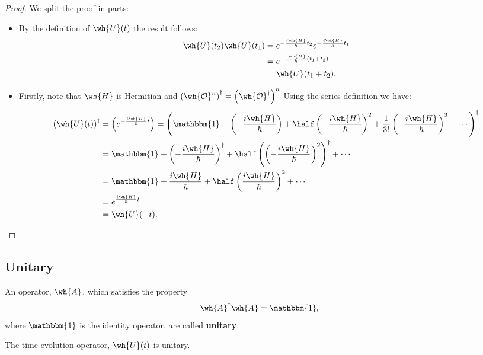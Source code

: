 \documentclass[12pt, a4paper]{article}
\begin{document}
\begin{proof}
    We split the proof in parts:
    \begin{itemize}
        \item By the definition of \(\wh{U}(t)\) the result follows:
        \[\begin{aligned}
            \wh{U}(t_2)\wh{U}(t_1) &= e^{-\frac{i\wh{H}}{\hbar}t_2} e^{-\frac{i\wh{H}}{\hbar}t_1} \\
            &= e^{-\frac{i\wh{H}}{\hbar}(t_1+t_2)} \\
            &= \wh{U}(t_1+t_2).
        \end{aligned}\]
        \item Firstly, note that \(\wh{H}\) is Hermitian and \(\left( \wh{\mathcal{O}}^n \right)^{\dagger} = \left( \wh{\mathcal{O}}^{\dagger} \right)^n\) Using the series definition we have:
        \[\begin{aligned}
            \left( \wh{U}(t) \right)^{\dagger} &= \left( e^{-\frac{i\wh{H}}{\hbar}t} \right) = \left( \mathbbm{1} + \left( -\frac{i\wh{H}}{\hbar} \right) + \half \left(  -\frac{i\wh{H}}{\hbar} \right)^2 + \frac{1}{3!} \left( -\frac{i\wh{H}}{\hbar} \right)^3+\cdots \right)^{\dagger} \\
            &= \mathbbm{1} + \left( -\frac{i\wh{H}}{\hbar} \right)^{\dagger} + \half \left( \left( -\frac{i\wh{H}}{\hbar} \right)^2 \right)^{\dagger} + \cdots \\
            &= \mathbbm{1} + \frac{i\wh{H}}{\hbar} + \half \left( \frac{i\wh{H}}{\hbar} \right)^2 +\cdots \\
            &= e^{\frac{i\wh{H}}{\hbar}t} \\
            &= \wh{U}(-t).
        \end{aligned}\]
    \end{itemize}
\end{proof}

\subsection{Unitary}

\begin{definition}
    An operator, \(\wh{A}\), which satisfies the property
    \[\wh{A}^{\dagger}\wh{A} = \mathbbm{1},\]
    where \(\mathbbm{1}\) is the identity operator, are called \textbf{unitary}.
\end{definition}

\begin{mdthm}
    The time evolution operator, \(\wh{U}(t)\) is unitary.
\end{mdthm}
\end{document}

